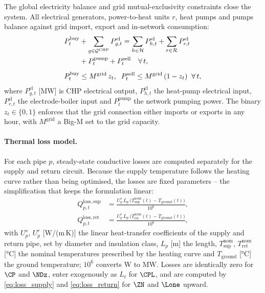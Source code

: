 The global electricity balance and grid mutual-exclusivity constraints close the system.
All electrical generators, power-to-heat units $r$, heat pumps and pumps balance against
grid import, export and in-network consumption:
%
\begin{align}
  P_t^{\mathrm{buy}}
    &+ \sum_{g \in \mathcal{G}^{\mathrm{CHP}}} P_{g,t}^{\mathrm{el}}
  = \sum_{h \in \mathcal{H}} P_{h,t}^{\mathrm{el}}
    + \sum_{r \in \mathcal{R}} P_{r,t}^{\mathrm{el}} \notag \\
    &+ P_t^{\mathrm{pump}} + P_t^{\mathrm{sell}}
  \quad \forall\, t,
  \label{eq:balance_el} \\[4pt]
  P_t^{\mathrm{buy}} &\leq M^{\mathrm{grid}}\, z_t,
  \;\;
  P_t^{\mathrm{sell}} \leq M^{\mathrm{grid}}\, (1 - z_t)
  \;\; \forall\, t,
  \label{eq:grid_bigm}
\end{align}
%
where $P_{g,t}^{\mathrm{el}}$ [MW] is CHP electrical output, $P_{h,t}^{\mathrm{el}}$ the
heat-pump electrical input, $P_{r,t}^{\mathrm{el}}$ the electrode-boiler input and
$P_t^{\mathrm{pump}}$ the network pumping power. The binary $z_t \in \{0,1\}$ enforces
that the grid connection either imports or exports in any hour, with $M^{\mathrm{grid}}$
a Big-M set to the grid capacity.

\paragraph{Thermal loss model.}
For each pipe $p$, steady-state conductive losses are computed separately for the supply
and return circuit. Because the supply temperature follows the heating curve rather than
being optimised, the losses are fixed parameters -- the simplification that keeps the
formulation linear:
%
\begin{align}
  Q_{p,t}^{\mathrm{loss,sup}} &= \frac{U^{s}_p\, L_p\,
    \bigl(T_{\mathrm{sup}}^{\mathrm{nom}}(t)
    - T_{\mathrm{ground}}(t)\bigr)}{10^6},
  \label{eq:loss_supply} \\[4pt]
  Q_{p,t}^{\mathrm{loss,ret}} &= \frac{U^{r}_p\, L_p\,
    \bigl(T_{\mathrm{ret}}^{\mathrm{nom}}(t)
    - T_{\mathrm{ground}}(t)\bigr)}{10^6},
  \label{eq:loss_return}
\end{align}
%
with $U^{s}_p$, $U^{r}_p$ [W/(m\,K)] the linear heat-transfer coefficients of the supply
and return pipe, set by diameter and insulation class, $L_p$ [m] the length,
$T_{\mathrm{sup}}^{\mathrm{nom}}$, $T_{\mathrm{ret}}^{\mathrm{nom}}$ [°C] the nominal
temperatures prescribed by the heating curve and $T_{\mathrm{ground}}$ [°C] the ground
temperature; $10^6$ converts W to MW. Losses are identically zero for $\CP$ and $\NDz$,
enter exogenously as $L_t$ for $\CPL$, and are computed by \eqref{eq:loss_supply} and
\eqref{eq:loss_return} for $\ZN$ and $\Lone$ upward.

